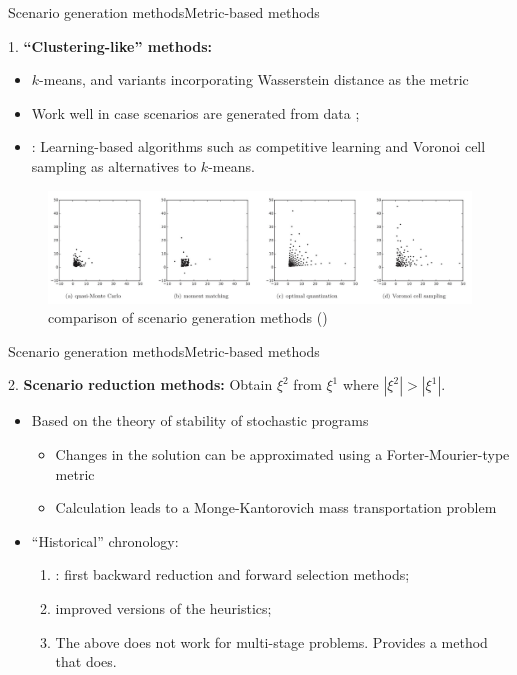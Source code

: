 \begin{frame}{Scenario generation methods}{Metric-based methods}
	
		{\color{blue}1.} {\bf ``Clustering-like'' methods:}
		\begin{itemize}
			\item $k$-means, and variants incorporating Wasserstein distance as the metric {\small \cite{condeixa2020wasserstein}}
			\item Work well in case scenarios are generated from \alert{data} {\small\cite{kaut2021scenario}};
			\item {\small \cite{lohndorf2016empirical}}: Learning-based algorithms such as competitive learning and Voronoi cell sampling as alternatives to $k$-means. 
		\end{itemize}
		\vspace{-6pt}	
		\begin{figure}
		\includegraphics[width=\textwidth]{figures/scen_methods(Lohndorf).pdf}
		\caption{comparison of scenario generation methods (\cite{lohndorf2016empirical})}			
		\end{figure}

	
\end{frame}

\begin{frame}{Scenario generation methods}{Metric-based methods}

		{\color{blue}2.} {\bf Scenario reduction methods:} Obtain $\xi^2$ from $\xi^1$ where $|\xi^2| > |\xi^1|$.
		\begin{itemize}
			\item Based on the theory of stability of stochastic programs {\small \cite{romisch2003stability}}
			\begin{itemize}
				\item Changes in the solution can be approximated using a Forter-Mourier-type metric
				\item Calculation leads to a Monge-Kantorovich mass transportation problem
			\end{itemize}	
			\item ``Historical'' chronology:
			\begin{enumerate}
				\item {\small \cite{dupavcova2003scenario, heitsch2003scenario}}: first \alert{backward reduction} and \alert{forward selection} methods;
				\item {\small \cite{heitsch2007note}} improved versions of the heuristics;
				\item \cite{heitsch2009scenario} The above does not work for \alert{multi-stage} problems. Provides a method that does.  
			\end{enumerate}
		\end{itemize}

\end{frame}

